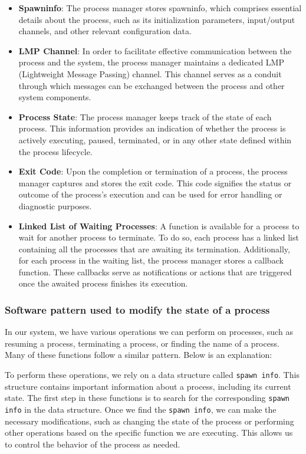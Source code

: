 \begin{itemize}
    \item \textbf{Spawninfo}: The process manager stores spawninfo, which comprises essential details about the process, such as its initialization parameters, input/output channels, and other relevant configuration data.

    \item \textbf{LMP Channel}: In order to facilitate effective communication between the process and the system, the process manager maintains a dedicated LMP (Lightweight Message Passing) channel. This channel serves as a conduit through which messages can be exchanged between the process and other system components.

    \item \textbf{Process State}: The process manager keeps track of the state of each process. This information provides an indication of whether the process is actively executing, paused, terminated, or in any other state defined within the process lifecycle.

    \item \textbf{Exit Code}: Upon the completion or termination of a process, the process manager captures and stores the exit code. This code signifies the status or outcome of the process's execution and can be used for error handling or diagnostic purposes.

    \item \textbf{Linked List of Waiting Processes}: A function is available for a process to wait for another process to terminate. To do so, each process has a linked list containing all the processes that are awaiting its termination. Additionally, for each process in the waiting list, the process manager stores a callback function. These callbacks serve as notifications or actions that are triggered once the awaited process finishes its execution.
\end{itemize}


\subsubsection{Software pattern used to modify the state of a process}

In our system, we have various operations we can perform on processes, such as resuming a process, terminating a process, or finding the name of a process. Many of these functions follow a similar pattern. Below is an explanation:

To perform these operations, we rely on a data structure called \texttt{spawn info}. This structure contains important information about a process, including its current state. The first step in these functions is to search for the corresponding \texttt{spawn info} in the data structure. Once we find the \texttt{spawn info}, we can make the necessary modifications, such as changing the state of the process or performing other operations based on the specific function we are executing. This allows us to control the behavior of the process as needed.


